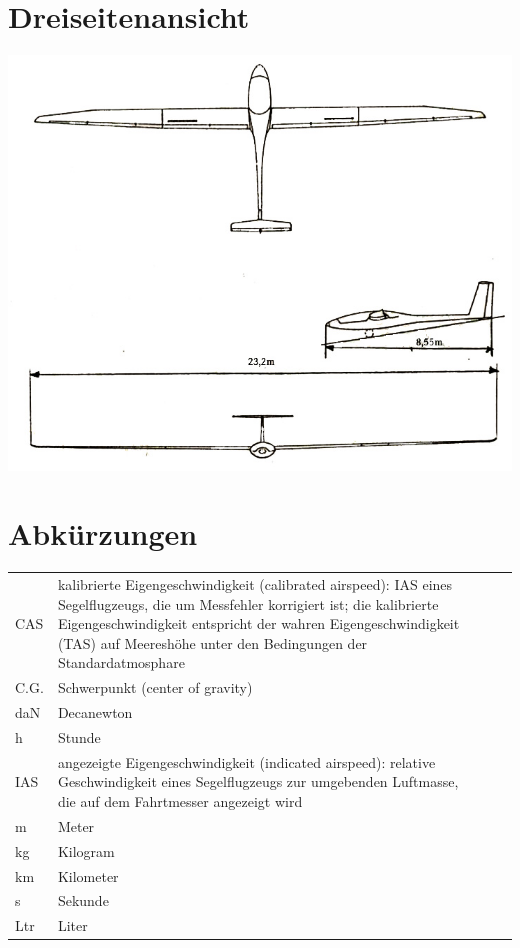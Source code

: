\section{Dreiseitenansicht}
\vspace{4cm}
\includegraphics[width=\textwidth]{3seiten.jpg}

\section{Abkürzungen}
\begin{tabular}{p{}p{}ll} 
CAS & kalibrierte Eigengeschwindigkeit (calibrated airspeed): IAS eines Segelflugzeugs, die um Messfehler korrigiert ist; die kalibrierte Eigengeschwindigkeit entspricht der wahren Eigengeschwindigkeit (TAS) auf Meereshöhe unter den Bedingungen der Standardatmosphare \\
C.G. & Schwerpunkt (center of gravity)\\
daN & Decanewton \\
h & Stunde \\
IAS & angezeigte Eigengeschwindigkeit (indicated airspeed): relative Geschwindigkeit eines Segelflugzeugs zur umgebenden Luftmasse, die auf dem Fahrtmesser angezeigt wird \\
m & Meter \\
kg & Kilogram  \\
km & Kilometer \\
s & Sekunde \\
Ltr & Liter \\
\end{tabular}

